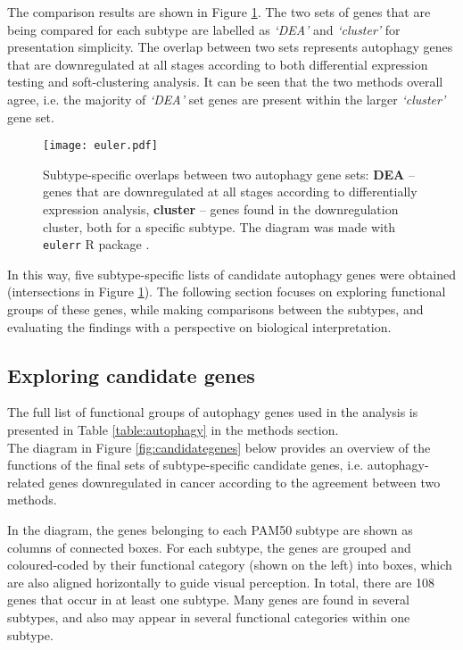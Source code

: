 The comparison results are shown in Figure \ref{fig:overlapdown}. The two sets of genes that are being compared for each subtype are labelled as \textit{‘DEA’} and \textit{‘cluster’ }for presentation simplicity. The overlap between two sets represents autophagy genes that are downregulated at all stages according to both differential expression testing and soft-clustering analysis. It can be seen that the two methods overall agree, i.e. the majority of \textit{‘DEA’} set genes are present within the larger \textit{‘cluster’ }gene set. 

            \begin{figure}[!h]
            \centering
            \texttt{[image: euler.pdf]} 
            \caption[Subtype-specific overlaps between downregulated autophagy genes identified by two methods]{Subtype-specific overlaps between two autophagy gene sets: \textbf{DEA} -- genes that are downregulated at all stages according to differentially expression analysis, \textbf{cluster} -- genes found in the downregulation cluster, both for a specific subtype. The diagram was made with \texttt{eulerr} R package \cite{euler}. }
            \label{fig:overlapdown}
            \end{figure}
            
In this way, five subtype-specific lists of candidate autophagy genes were obtained (intersections in Figure \ref{fig:overlapdown}). The following section focuses on exploring functional groups of these genes, while making comparisons between the subtypes, and evaluating the findings with a perspective on biological interpretation. 


\subsection{Exploring candidate genes}

The full list of functional groups of autophagy genes used in the analysis is presented in Table \ref{table:autophagy} in the methods section.\\
The diagram in Figure \ref{fig:candidategenes} below provides an overview of the functions of the final sets of subtype-specific candidate genes, i.e. autophagy-related genes downregulated in cancer according to the agreement between two methods. 

In the diagram, the genes belonging to each PAM50 subtype are shown as columns of connected boxes. For each subtype, the genes are grouped and coloured-coded by their functional category (shown on the left) into boxes, which are also aligned horizontally to guide visual perception. In total, there are 108 genes that occur in at least one subtype. Many genes are found in several subtypes, and also may appear in several functional categories within one subtype. 

